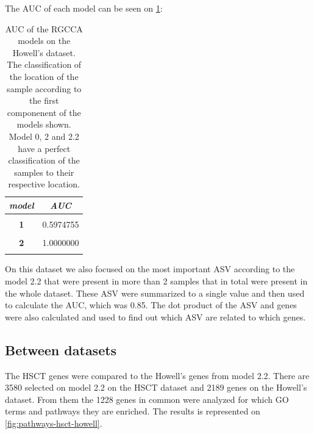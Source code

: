 \documentclass[
  12pt,
  a4paper,
  twoside,
  openright]{book}
\begin{document}
The AUC of each model can be seen on \ref{tab:howell-auc}:

\begin{table}[H]

\caption[AUC of the RGCCA models on the Howell's dataset]{\label{tab:howell-auc}AUC of the RGCCA models on the Howell's dataset. The classification of the location of the sample according to the first componenent of the models shown. Model 0, 2 and 2.2 have a perfect classification of the samples to their respective location.}
\centering
\begin{tabular}[t]{|>{}c|>{}c|}
\hline
\em{\textbf{model}} & \em{\textbf{AUC}}\\
\hline
\textbf{\cellcolor{gray!6}{0}} & \cellcolor{gray!6}{0.6255259}\\
\hline
\textbf{1} & 0.5974755\\
\hline
\textbf{\cellcolor{gray!6}{1.2}} & \cellcolor{gray!6}{1.0000000}\\
\hline
\textbf{2} & 1.0000000\\
\hline
\textbf{\cellcolor{gray!6}{2.2}} & \cellcolor{gray!6}{1.0000000}\\
\hline
\end{tabular}
\end{table}

On this dataset we also focused on the most important ASV according to the model 2.2 that were present in more than 2 samples that in total were present in the whole dataset.
These ASV were summarized to a single value and then used to calculate the AUC, which was 0.85.
The dot product of the ASV and genes were also calculated and used to find out which ASV are related to which genes.

\hypertarget{between-datasets}{%
\subsection{Between datasets}\label{between-datasets}}

The HSCT genes were compared to the Howell's genes from model 2.2.
There are 3580 selected on model 2.2 on the HSCT dataset and 2189 genes on the Howell's dataset.
From them the 1228 genes in common were analyzed for which GO terms and pathways they are enriched.
The results is represented on \ref{fig:pathways-hsct-howell}.
\end{document}
